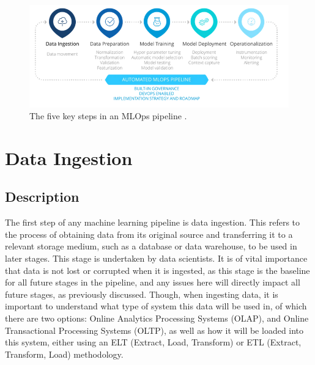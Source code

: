 \documentclass[12pt]{report}
\begin{document}





\begin{figure}[H]
    \centering
    \includegraphics[width=.75\linewidth]{MLPipeline.png}
    \caption{The five key steps in an MLOps pipeline \autocite{incycle_software_mlops_nodate}.}
    \label{fig:MLPipeline}
\end{figure}

\section{Data Ingestion}
\subsection{Description}
The first step of any machine learning pipeline is data ingestion. This refers to the process of obtaining data from its original source
and transferring it to a relevant storage medium, such as a database or data warehouse, to be used in later stages. This stage 
is undertaken by data scientists.
It is of vital importance that data is not lost or corrupted when it is ingested, as this stage is the baseline for all future stages in the pipeline, and any issues
here will directly impact all future stages, as previously discussed. Though, when ingesting data, it is important to understand what type of system this data 
will be used in, of which there are two options: Online Analytics Processing Systems (OLAP), and Online Transactional Processing Systems (OLTP), as well 
as how it will be loaded into this system, either using an ELT (Extract, Load, Transform) or ETL (Extract, Transform, Load) methodology.
\end{document}

